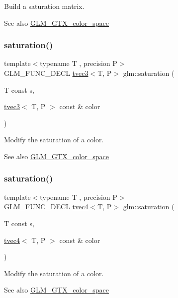 Build a saturation matrix. \begin{DoxySeeAlso}{See also}
\hyperlink{group__gtx__color__space}{G\+L\+M\+\_\+\+G\+T\+X\+\_\+color\+\_\+space} 
\end{DoxySeeAlso}
\mbox{\label{group__gtx__color__space_ga632ee8dadb44e90a05885f6f8c07d46c}} 
\subsubsection{\texorpdfstring{saturation()}{saturation()}\hspace{0.1cm}{\footnotesize\ttfamily [2/3]}}
{\footnotesize\ttfamily template$<$typename T , precision P$>$ \\
G\+L\+M\+\_\+\+F\+U\+N\+C\+\_\+\+D\+E\+CL \hyperlink{structglm_1_1tvec3}{tvec3}$<$T, P$>$ glm\+::saturation (\begin{DoxyParamCaption}\item[{T const}]{s,  }\item[{\hyperlink{structglm_1_1tvec3}{tvec3}$<$ T, P $>$ const \&}]{color }\end{DoxyParamCaption})}

Modify the saturation of a color. \begin{DoxySeeAlso}{See also}
\hyperlink{group__gtx__color__space}{G\+L\+M\+\_\+\+G\+T\+X\+\_\+color\+\_\+space} 
\end{DoxySeeAlso}
\mbox{\label{group__gtx__color__space_ga2033e0566c595230714af396744e8a61}} 
\subsubsection{\texorpdfstring{saturation()}{saturation()}\hspace{0.1cm}{\footnotesize\ttfamily [3/3]}}
{\footnotesize\ttfamily template$<$typename T , precision P$>$ \\
G\+L\+M\+\_\+\+F\+U\+N\+C\+\_\+\+D\+E\+CL \hyperlink{structglm_1_1tvec4}{tvec4}$<$T, P$>$ glm\+::saturation (\begin{DoxyParamCaption}\item[{T const}]{s,  }\item[{\hyperlink{structglm_1_1tvec4}{tvec4}$<$ T, P $>$ const \&}]{color }\end{DoxyParamCaption})}

Modify the saturation of a color. \begin{DoxySeeAlso}{See also}
\hyperlink{group__gtx__color__space}{G\+L\+M\+\_\+\+G\+T\+X\+\_\+color\+\_\+space} 
\end{DoxySeeAlso}
